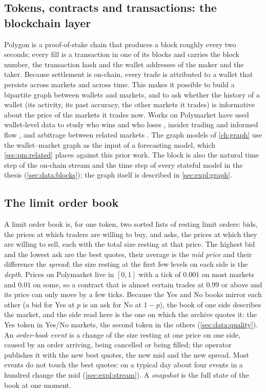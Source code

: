 \subsection{Tokens, contracts and transactions: the blockchain layer}
\label{sec:pm:chain}

Polygon is a proof-of-stake chain that produces a block roughly every two seconds; every
fill is a transaction in one of its blocks and carries the block number, the transaction
hash and the wallet addresses of the maker and the taker.  Because settlement is on-chain,
every trade is attributed to a wallet that persists across markets and across time.  This
makes it possible to build a bipartite graph between wallets and markets, and to ask whether
the history of a wallet (its activity, its past accuracy, the other markets it trades) is
informative about the price of the markets it trades now.  Works on Polymarket have used
wallet-level data to study who wins and who loses \cite{akey2026whowins}, insider trading and
informed flow \cite{bsic2026polymarket}, and arbitrage between related markets
\cite{saguillo2025unravelling}.  The graph models of \cref{ch:graph} use the wallet--market graph as the
input of a forecasting model, which \cref{sec:pm:related} places against this prior work.  The block is also the natural time step of the
on-chain stream and the time step of every stateful model in the thesis
(\cref{sec:data:blocks}); the graph itself is described in \cref{sec:expl:graph}.

\subsection{The limit order book}
\label{sec:pm:lob}

A limit order book \cite{gould2013limit} is, for one token, two sorted lists of resting
limit orders: bids, the prices at which traders are willing to buy, and asks, the prices at
which they are willing to sell, each with the total size resting at that price.  The highest
bid and the lowest ask are the best quotes, their average is the \emph{mid price} and their
difference the \emph{spread}; the size resting at the first few levels on each side is the
\emph{depth}.  Prices on Polymarket live in $[0, 1]$ with a tick of $0.001$ on most markets
and $0.01$ on some, so a contract that is almost certain trades at $0.99$ or above and its
price can only move by a few ticks.  Because the Yes and No books mirror each other (a bid
for Yes at $p$ is an ask for No at $1 - p$), the book of one side describes the market, and
the side read here is the one on which the archive quotes it: the Yes token in Yes/No
markets, the second token in the others (\cref{sec:data:quality}).  An \emph{order-book event} is a change of the size resting
at one price on one side, caused by an order arriving, being cancelled or being filled; the
operator publishes it with the new best quotes, the new mid and the new spread.  Most events
do not touch the best quotes: on a typical day about four events in a hundred change the mid
(\cref{sec:expl:stream}).  A \emph{snapshot} is the full state of the book at one moment.

